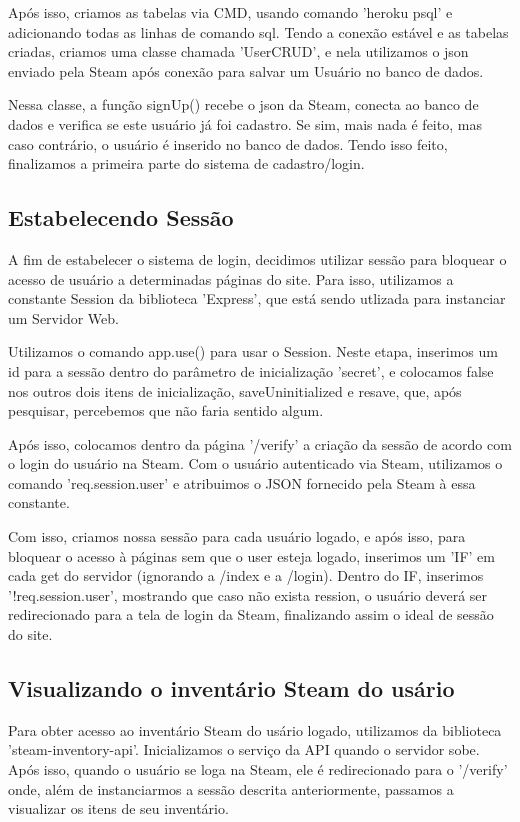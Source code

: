 \documentclass[a4paper,12pt]{article}
\begin{document}
    Após isso, criamos as tabelas via CMD, usando comando 'heroku psql' e adicionando todas as linhas de comando sql.
    Tendo a conexão estável e as tabelas criadas, criamos uma classe chamada 'UserCRUD', e nela utilizamos o json 
    enviado pela Steam após conexão para salvar um Usuário no banco de dados.

    Nessa classe, a função signUp() recebe o json da Steam, conecta ao banco de dados e verifica se este usuário 
    já foi cadastro. Se sim, mais nada é feito, mas caso contrário, o usuário é inserido no banco de dados.
    Tendo isso feito, finalizamos a primeira parte do sistema de cadastro/login.

    \subsection{Estabelecendo Sessão}
    A fim de estabelecer o sistema de login, decidimos utilizar sessão para bloquear o acesso de usuário a 
    determinadas páginas do site. Para isso, utilizamos a constante Session da biblioteca 'Express', que está 
    sendo utlizada para instanciar um Servidor Web.

    Utilizamos o comando app.use() para usar o Session. Neste etapa, inserimos um id para a sessão dentro do 
    parâmetro de inicialização 'secret', e colocamos false nos outros dois itens de inicialização, saveUninitialized e resave, que, 
    após pesquisar, percebemos que não faria sentido algum.

    Após isso, colocamos dentro da página '/verify' a criação da sessão de acordo com o login do usuário na Steam. 
    Com o usuário autenticado via Steam, utilizamos o comando 'req.session.user' e atribuimos o JSON fornecido pela Steam 
    à essa constante.

    Com isso, criamos nossa sessão para cada usuário logado, e após isso, para bloquear o acesso à páginas sem que o user 
    esteja logado, inserimos um 'IF' em cada get do servidor (ignorando a /index e a /login). Dentro do IF, 
    inserimos '!req.session.user', mostrando que caso não exista ression, o usuário deverá ser redirecionado para a 
    tela de login da Steam, finalizando assim o ideal de sessão do site. 

    \subsection{Visualizando o inventário Steam do usário}
    Para obter acesso ao inventário Steam do usário logado, utilizamos da biblioteca 'steam-inventory-api'. 
    Inicializamos o serviço da API quando o servidor sobe. Após isso, quando o usuário se loga na Steam, ele é redirecionado para o '/verify' onde, 
    além de instanciarmos a sessão descrita anteriormente, passamos a visualizar os itens de seu inventário.
    
\end{document}
